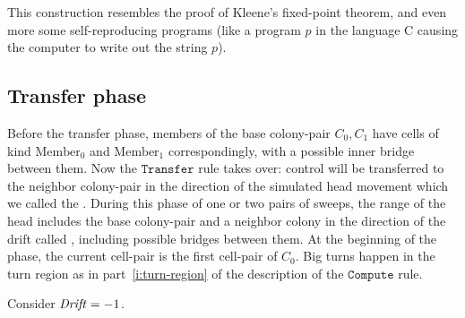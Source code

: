 \documentclass[11pt]{memoir}
\theoremstyle{definition} %
\newcommand{\fld}[1]{\ensuremath{\textit{#1\/}}}
\newcommand{\rul}[1]{\ensuremath{\texttt{#1}}}
\newcommand{\Drift}{\fld{Drift}}
\newcommand{\Member}{\mathrm{Member}}
\newcommand{\Compute}{\rul{Compute}}
\newcommand{\Transfer}{\rul{Transfer}}
\begin{document}
\begin{remark}
  This construction resembles the proof of Kleene's fixed-point theorem, and even more
  some self-reproducing programs (like a program \( p \) in the language C causing the computer
  to write out the string \( p \)).
\end{remark}

\subsection{Transfer phase}\label{sec:transfer}

Before the transfer phase, members of the base colony-pair \( C_{0},C_{1} \) have
cells of kind \( \Member_{0} \) and \( \Member_{1} \) correspondingly,
with a possible inner bridge between them.
Now the \( \Transfer \) rule takes over: control will be transferred to the
neighbor colony-pair in the direction of the simulated head movement which we called 
the .
During this phase of one or two pairs of sweeps, the range of the head
includes the base colony-pair and a neighbor colony
in the direction of the drift called , including possible bridges between them.
At the beginning of the phase, the current cell-pair is the first cell-pair of \( C_{0} \).
Big turns happen in the turn region as in part~\ref{i:turn-region} of the
description of the \( \Compute \) rule.

Consider \( \Drift=-1 \).
\end{document}
